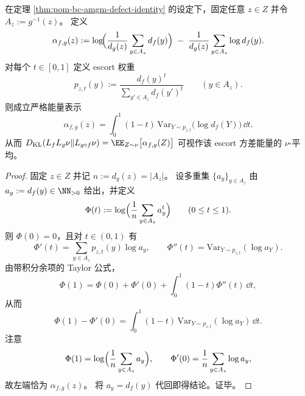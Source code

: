 \begin{proposition}\label{prop:pom-bc-amgm-defect-escort-variance-energy}
在定理 \ref{thm:pom-bc-amgm-defect-identity} 的设定下，固定任意 \(z\in Z\) 并令 \(A_z:=g^{-1}(z)\)。
定义
\[
\alpha_{f,g}(z)
:=\log\!\Bigl(\frac{1}{d_g(z)}\sum_{y\in A_z}d_f(y)\Bigr)
\;-\;
\frac{1}{d_g(z)}\sum_{y\in A_z}\log d_f(y).
\]
对每个 \(t\in[0,1]\) 定义 escort 权重
\[
p_{z,t}(y):=\frac{d_f(y)^t}{\sum_{y'\in A_z}d_f(y')^t}\qquad(y\in A_z).
\]
则成立严格能量表示
\[
\boxed{\;
\alpha_{f,g}(z)
=\int_0^1 (1-t)\,\mathrm{Var}_{Y\sim p_{z,t}}\!\bigl(\log d_f(Y)\bigr)\,\dd t.\;}
\]
从而
\(
D_{\mathrm{KL}}(L_fL_g\nu\|L_{g\circ f}\nu)=\EE_{Z\sim\nu}\bigl[\alpha_{f,g}(Z)\bigr]
\)
可视作该 escort 方差能量的 \(\nu\)-平均。
\end{proposition}
\begin{proof}
固定 \(z\in Z\) 并记 \(n:=d_g(z)=|A_z|\)。
设多重集 \(\{a_y\}_{y\in A_z}\) 由 \(a_y:=d_f(y)\in\NN_{>0}\) 给出，并定义
\[
\Phi(t):=\log\Bigl(\frac{1}{n}\sum_{y\in A_z}a_y^{t}\Bigr)\qquad(0\le t\le 1).
\]
则 \(\Phi(0)=0\)，且对 \(t\in(0,1)\) 有
\[
\Phi'(t)=\sum_{y\in A_z}p_{z,t}(y)\log a_y,\qquad
\Phi''(t)=\mathrm{Var}_{Y\sim p_{z,t}}(\log a_Y).
\]
由带积分余项的 Taylor 公式，
\[
\Phi(1)=\Phi(0)+\Phi'(0)+\int_0^1(1-t)\Phi''(t)\,\dd t,
\]
从而
\[
\Phi(1)-\Phi'(0)=\int_0^1(1-t)\,\mathrm{Var}_{Y\sim p_{z,t}}(\log a_Y)\,\dd t.
\]
注意
\[
\Phi(1)=\log\Bigl(\frac1n\sum_{y\in A_z}a_y\Bigr),\qquad
\Phi'(0)=\frac1n\sum_{y\in A_z}\log a_y,
\]
故左端恰为 \(\alpha_{f,g}(z)\)。
将 \(a_y=d_f(y)\) 代回即得结论。证毕。
\end{proof}

